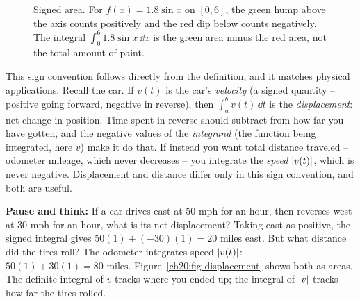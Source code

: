 \begin{figure}[htbp]
\centering
{}
\caption{Signed area. For $f(x)=1.8\sin x$ on $[0,6]$, the green hump above the
axis counts positively and the red dip below counts negatively. The integral
$\int_0^6 1.8\sin x\,\dd x$ is the green area minus the red area, not the total
amount of paint.}
\label{ch20:fig-signed}
\end{figure}

This sign convention follows directly from the definition,
and it matches physical applications. Recall the car. If $v(t)$ is the car's
\emph{velocity} (a signed quantity -- positive going forward, negative in
reverse), then $\int_a^b v(t)\,\dd t$ is the \emph{displacement}: net change in
position. Time spent in reverse should subtract from how far you have gotten, and
the negative values of the \emph{integrand} (the function being integrated, here
$v$) make it do that. If instead you want total
distance traveled -- odometer mileage, which never decreases -- you integrate the
\emph{speed} $\lvert v(t)\rvert$, which is never negative. Displacement and distance
differ only in this sign convention, and both are useful.

\begin{recoverybox}
\textbf{Pause and think:} If a car drives east at $50\text{ mph}$ for an hour, then reverses west at $30\text{ mph}$ for an hour, what is its net displacement? Taking east as positive, the signed integral gives $50(1) + (-30)(1) = 20\text{ miles}$ east. But what distance did the tires roll? The odometer integrates speed $\lvert v(t)\rvert$: $50(1) + 30(1) = 80\text{ miles}$. Figure~\ref{ch20:fig-displacement} shows both as areas. The definite integral of $v$ tracks where you ended up; the integral of $\lvert v\rvert$ tracks how far the tires rolled.
\end{recoverybox}

